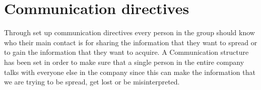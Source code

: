 \documentclass[12pt]{article}
\begin{document}
    \section{Communication directives}
Through set up communication directives every person in the group should know who their main contact is for sharing the information that they want to spread or to gain the information that they want to acquire. A Communication structure has been set in order to make sure that a single person in the entire company talks with everyone else in the company since this can make the information that we are trying to be spread, get lost or be misinterpreted.    
\end{document}
